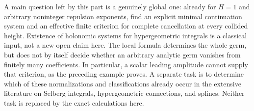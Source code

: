 \documentclass[11pt,a4paper]{article}
\theoremstyle{definition}
\theoremstyle{remark}
\numberwithin{equation}{section}
\begin{document}
A main question left by this part is a genuinely global
one: already for $H=1$ and arbitrary noninteger repulsion exponents,
find an explicit minimal continuation system and an effective finite
criterion for complete cancellation at every collided height.
Existence of holonomic systems for hypergeometric integrals is a
classical input, not a new open claim here. The local formula determines the whole
germ, but does not by itself decide whether an arbitrary analytic germ
vanishes from finitely many coefficients. In particular, a scalar
leading amplitude cannot supply that criterion, as the preceding
example proves. A separate task is to determine which of these
normalizations and classifications already occur in the extensive
literature on Selberg integrals, hypergeometric connections, and
splines. Neither task is replaced by the exact calculations here.
\end{document}
